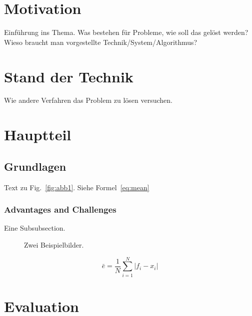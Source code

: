 \documentclass{llncs}
\begin{document}
\newpage

\section{Motivation}
\label{sec:Motivation}
Einführung ins Thema. Was bestehen für Probleme, wie soll das gelöst werden? \\

Wieso braucht man vorgestellte Technik/System/Algorithmus?



\section{Stand der Technik} \label{sec:sdt}
%
Wie andere Verfahren das Problem zu lösen versuchen. \cite{OCBible}

\section{Hauptteil}
\label{sec:Hauptteil}

\subsection{Grundlagen}
\label{sec:Grundlagen}
Text zu Fig.~\ref{fig:abb1}. Siehe Formel~\ref{eq:mean}

\subsubsection{Advantages and Challenges}
Eine Subsubsection.


\begin{figure}
	\centering
	\hfill
	\caption{Zwei Beispielbilder.}
\end{figure}

\begin{equation}
\label{eq:mean}
\bar{e} = \frac{1}{N}\sum_{i=1}^N{\lvert f_i - x_i\rvert}
\end{equation}


\section{Evaluation}
\end{document}

